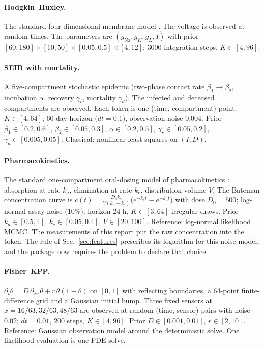 \documentclass[10pt]{article}
\begin{document}
\paragraph{Hodgkin--Huxley.} The standard four-dimensional membrane model \citep{hodgkin1952}. The
voltage is observed at random times. The parameters are $(g_{\mathrm{Na}}, g_K, g_L, I)$ with prior
$[60, 180] \times [10, 50] \times [0.05, 0.5] \times [4, 12]$; $3000$ integration steps,
$K \in [4, 96]$.

\paragraph{SEIR with mortality.} A five-compartment stochastic epidemic (two-phase contact rate
$\beta_1 \to \beta_2$, incubation $\alpha$, recovery $\gamma_r$, mortality $\gamma_d$). The infected
and deceased compartments are observed. Each token is one (time, compartment) point, $K \in [4, 64]$;
60-day horizon ($dt = 0.1$), observation noise $0.004$. Prior $\beta_1 \in [0.2, 0.6]$,
$\beta_2 \in [0.05, 0.3]$, $\alpha \in [0.2, 0.5]$, $\gamma_r \in [0.05, 0.2]$,
$\gamma_d \in [0.005, 0.05]$. Classical: nonlinear least squares on $(I, D)$.

\paragraph{Pharmacokinetics.} The standard one-compartment oral-dosing model of pharmacokinetics
\citep[e.g.][]{gabrielsson2000}: absorption at rate $k_a$, elimination at rate $k_e$, distribution
volume $V$. The Bateman concentration curve is
$c(t) = \frac{D_0 k_a}{V(k_a - k_e)}\bigl(e^{-k_e t} - e^{-k_a t}\bigr)$ with dose $D_0 = 500$;
log-normal assay noise ($10\%$); horizon 24 h, $K \in [3, 64]$ irregular draws. Prior
$k_a \in [0.5, 4]$, $k_e \in [0.05, 0.4]$, $V \in [20, 100]$. Reference: log-normal likelihood MCMC.
The measurements of this report put the raw concentration into the token. The rule of
Sec.~\ref{sec:features} prescribes its logarithm for this noise model, and the package now requires
the problem to declare that choice.

\paragraph{Fisher--KPP.} $\partial_t \theta = D\,\partial_{xx} \theta + r\,\theta(1 - \theta)$ on
$[0, 1]$ with reflecting boundaries, a 64-point finite-difference grid and a Gaussian initial bump.
Three fixed sensors at $x = 16/63, 32/63, 48/63$ are observed at random (time, sensor) pairs with
noise $0.02$; $dt = 0.01$, $200$ steps, $K \in [4, 96]$. Prior $D \in [0.001, 0.01]$,
$r \in [2, 10]$. Reference: Gaussian observation model around the deterministic solve. One likelihood
evaluation is one PDE solve.
\end{document}
